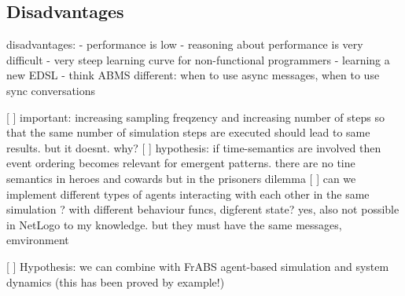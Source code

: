 \subsection{Disadvantages}
disadvantages:
	- performance is low
	- reasoning about performance is very difficult
	- very steep learning curve for non-functional programmers
	- learning a new EDSL
	- think ABMS different: when to use async messages, when to use sync conversations


[ ] important: increasing sampling freqzency and increasing number of steps so that the same number of simulation steps are executed should lead to same results. but it doesnt. why?
[ ] hypothesis: if time-semantics are involved then event ordering becomes relevant for emergent patterns. there are no tine semantics in heroes and cowards but in the prisoners dilemma
[ ] can we implement different types of agents interacting with each other in the same simulation ? with different behaviour funcs, digferent state? yes, also not possible in NetLogo to my knowledge. but they must have the same messages, emvironment 

[ ] Hypothesis: we can combine with FrABS agent-based simulation and system dynamics (this has been proved by example!)